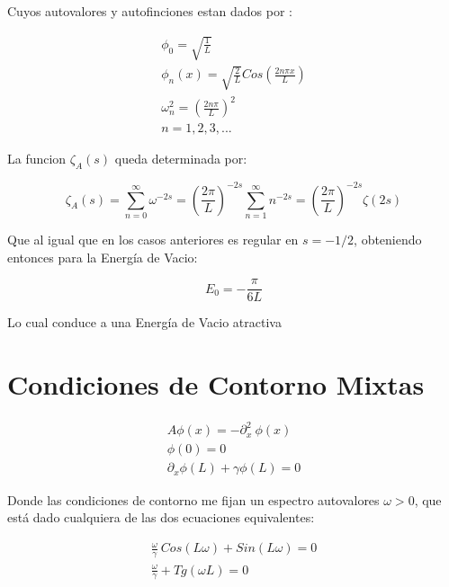 Cuyos autovalores y autofinciones estan dados por  : 

\begin{equation}
\begin{array}{c}
	\phi _{0} = \sqrt{\frac{1}{L}} \\ 
	\phi _{n} (x) = \sqrt{\frac{2}{L}} Cos( \frac{2 n \pi x}{L} ) \\
	\omega _n ^2 = \left( \frac{2 n \pi }{L} \right) ^2 \\
	n = 1,2,3, ...
\end{array}
\end{equation}

La funcion $\zeta _A (s)$ queda determinada por:

\begin{equation}
\zeta _A (s) = 
\sum _{n=0} ^{\infty} \omega ^{-2s} =  
\left( \frac{2 \pi}{L} \right) ^{-2s} \sum _{n=1} ^{\infty} n ^{-2s} = 
\left( \frac{2 \pi}{L} \right) ^{-2s} \zeta (2s)
\end{equation}

Que al igual que en los casos anteriores es regular en $s=-1/2$, obteniendo entonces para la Energía de Vacio:

\begin{equation}
E _0 = - \frac{\pi}{6 L}
\end{equation}

Lo cual conduce a una Energía de Vacio atractiva

\section{Condiciones de Contorno Mixtas}

\begin{equation}
\begin{array}{c}
    A \phi (x) = - \partial ^2 _x \ \phi (x)  \\
    \phi (0) = 0 \\ 
    \partial _x \phi (L) + \gamma \phi (L) = 0
\end{array}
\end{equation}

Donde las condiciones de contorno me fijan un espectro autovalores $\omega > 0 $, que está dado cualquiera de las dos ecuaciones equivalentes: 

\begin{equation}
\begin{array}{cc}
    \frac{\omega}{\gamma}  \ Cos( L \omega ) +   Sin( L \omega ) = 0 \\
    \frac{\omega}{\gamma}  + Tg(\omega L )  = 0 
\label{autovalores}
\end{array}
\end{equation}

